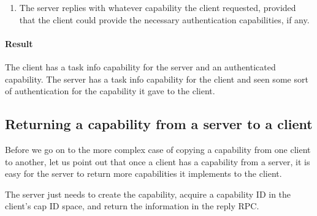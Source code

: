 \begin{enumerate}
\begin{itemize}
    \begin{comment}
      The Hurd used to store the signal capability in the proc server,
      where authorized tasks could look it up.  This is no longer
      possible because a server can not accept capabilities
      implemented by untrusted tasks, see below.
    \end{comment}
  \end{itemize}
  
\item The server replies with whatever capability the client
  requested, provided that the client could provide the necessary
  authentication capabilities, if any.

  \begin{comment}
    It is not required that the server performs any authentication at
    all, but it is recommended, and all Hurd servers will do so.
    
    In particular, the server should normally only allow access from
    tasks running in the same system, if running multiple systems on
    the same host is possible.
  \end{comment}
\end{enumerate}

\paragraph{Result}
The client has a task info capability for the server and an
authenticated capability.  The server has a task info capability for
the client and seen some sort of authentication for the capability it
gave to the client.

\begin{comment}
  If you think that the above protocol is complex, you have seen
  nothing yet!  Read on.
\end{comment}


\subsection{Returning a capability from a server to a client}

Before we go on to the more complex case of copying a capability from
one client to another, let us point out that once a client has a
capability from a server, it is easy for the server to return more
capabilities it implements to the client.

The server just needs to create the capability, acquire a capability
ID in the client's cap ID space, and return the information in the
reply RPC.

